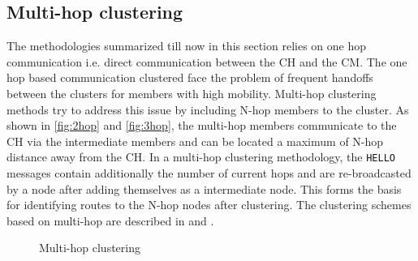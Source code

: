 \documentclass[]{ccs-thesis}
\begin{document}
\subsection{Multi-hop clustering}

The methodologies summarized till now in this section relies on one hop communication i.e. direct communication between
the \ac{CH} and the \ac{CM}. The one hop based communication clustered face the problem of frequent handoffs between
the clusters for members with high mobility. Multi-hop clustering methods try to address this issue by including N-hop
members to the cluster. As shown in \ref{fig:2hop} and \ref{fig:3hop}, the multi-hop members communicate to the \ac{CH}
via the intermediate members and can be located a maximum of N-hop distance away from the \ac{CH}. In a multi-hop
clustering methodology, the \texttt{HELLO} messages contain additionally the number of current hops and are re-broadcasted
by a node after adding themselves as a intermediate node. This forms the basis for identifying routes to the N-hop nodes
after clustering. The clustering schemes based on multi-hop are described in \cite{Zhang2069135} and \cite{6554933}.

\begin{figure}[h]%
	\centering
    \hfill%
    \hfill%
	\caption{Multi-hop clustering}%
	\label{fig:multihop}%
\end{figure}
\end{document}
